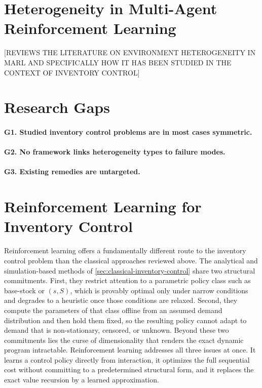 \section{Heterogeneity in Multi-Agent Reinforcement Learning}
\label{sec:heterogeneity-in-marl}

[REVIEWS THE LITERATURE ON ENVIRONMENT HETEROGENEITY IN MARL AND SPECIFICALLY HOW IT HAS BEEN STUDIED IN THE CONTEXT OF INVENTORY CONTROL]


\section{Research Gaps}
\label{sec:research-gaps}
\paragraph{\textbf{G1. Studied inventory control problems are in most cases symmetric.}}

\paragraph{\textbf{G2. No framework links heterogeneity types to failure modes.}}

\paragraph{\textbf{G3. Existing remedies are untargeted.}}


\section{Reinforcement Learning for Inventory Control}
\label{sec:rl-inventory-control}

Reinforcement learning offers a fundamentally different route to the inventory control problem than the classical approaches reviewed above. The analytical and simulation-based methods of \autoref{sec:classical-inventory-control} share two structural commitments. First, they restrict attention to a parametric policy class such as base-stock or $(s, S)$, which is provably optimal only under narrow conditions and degrades to a heuristic once those conditions are relaxed. Second, they compute the parameters of that class offline from an assumed demand distribution and then hold them fixed, so the resulting policy cannot adapt to demand that is non-stationary, censored, or unknown. Beyond these two commitments lies the curse of dimensionality that renders the exact dynamic program intractable. Reinforcement learning addresses all three issues at once. It learns a control policy directly from interaction, it optimizes the full sequential cost without committing to a predetermined structural form, and it replaces the exact value recursion by a learned approximation.

